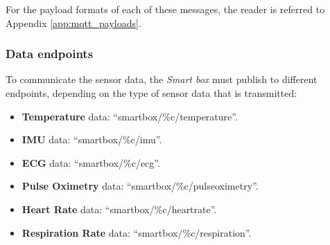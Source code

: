 For the payload formats of each of these messages, the reader is referred to Appendix \ref{app:mqtt_payloads}.

\subsubsection{Data endpoints}
To communicate the sensor data, the \textit{Smart box} must publish to different endpoints, depending on the type of sensor data that is transmitted:

\begin{itemize}
    \item \textbf{Temperature} data: ``smartbox/\%c/temperature''.
    \item \textbf{\acf{IMU}} data: ``smartbox/\%c/imu''.
    \item \textbf{\acf{ECG}} data: ``smartbox/\%c/ecg''.
    \item \textbf{Pulse Oximetry} data: ``smartbox/\%c/pulseoximetry''.
    \item \textbf{Heart Rate} data: ``smartbox/\%c/heartrate''.
    \item \textbf{Respiration Rate} data: ``smartbox/\%c/respiration''.
\end{itemize}

